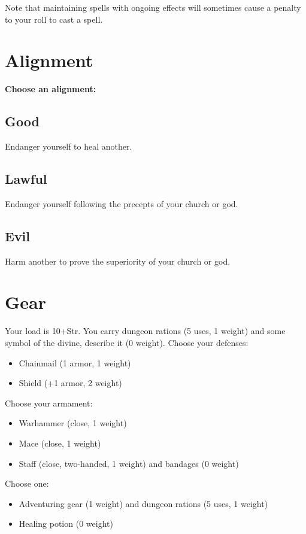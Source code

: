  Note that maintaining spells with ongoing effects will sometimes cause a penalty to your roll to cast a spell.
\section*{Alignment}


{\bfseries Choose an alignment:}
\subsection{Good}


 Endanger yourself to heal another.
\subsection{Lawful}


 Endanger yourself following the precepts of your church or god.
\subsection{Evil}


 Harm another to prove the superiority of your church or god.
\section*{Gear}


 Your load is 10+Str. You carry dungeon rations (5 uses, 1 weight) and some symbol of the divine, describe it (0 weight). Choose your defenses:
\begin{itemize}
\item Chainmail (1 armor, 1 weight)
\item Shield (+1 armor, 2 weight)

\end{itemize}


 Choose your armament:
\begin{itemize}
\item Warhammer (close, 1 weight)
\item Mace (close, 1 weight)
\item Staff (close, two-handed, 1 weight) and bandages (0 weight)

\end{itemize}


 Choose one:
\begin{itemize}
\item Adventuring gear (1 weight) and dungeon rations (5 uses, 1 weight)
\item Healing potion (0 weight)

\end{itemize}
